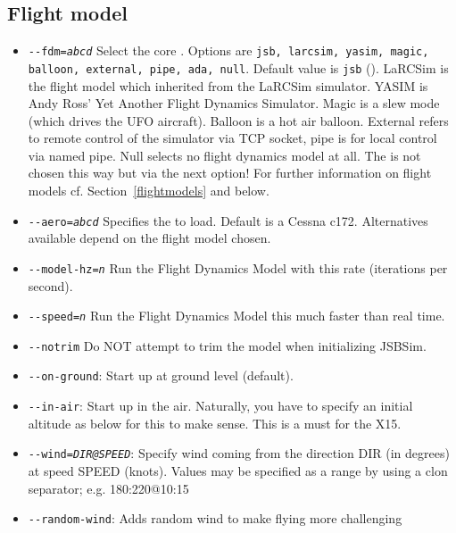 \subsection{Flight model}\label{flight dynamics model}
\begin{itemize}
\item{\texttt{-$ $-fdm={\it abcd}}} Select the core .
Options are \texttt{jsb, larcsim, yasim, magic, balloon, external, pipe, ada, null}. Default value is
\texttt{jsb} (\JSBSim). LaRCSim is the flight model which
\FlightGear{} inherited from the LaRCSim simulator.  YASIM is Andy Ross' Yet
Another Flight Dynamics Simulator. Magic is a slew mode (which drives the
UFO aircraft). Balloon is a hot air balloon. External refers to remote
control of the simulator via TCP socket, pipe is for local control via named
pipe. Null selects no flight dynamics model at all. The  is not chosen this way but via the next option! For further
information on flight models cf. Section~\ref{flightmodels} and below.
\item{\texttt{-$ $-aero={\it abcd}}} Specifies the  to load. Default is a Cessna c172. Alternatives available depend on the flight model chosen.
\item{\texttt{-$ $-model-hz={\it n}}} Run the Flight Dynamics Model with this rate
(iterations per second).
\item{\texttt{-$ $-speed={\it n}}} Run the Flight Dynamics Model this much faster than real
time.
\item{\texttt{-$ $-notrim}} Do NOT attempt to trim the model when initializing JSBSim.
\item{\texttt{-$ $-on-ground}}: Start up at ground level (default).
\item{\texttt{-$ $-in-air}}: Start up in the air. Naturally, you have to specify an
initial altitude as below for this to make sense. This is a must for the X15.
\item{\texttt{-$ $-wind={\it DIR@SPEED}}}: Specify wind coming from the direction DIR (in
degrees) at speed SPEED (knots). Values may be specified as a range by using a clon separator; e.g. 180:220@10:15
\item{\texttt{-$ $-random-wind}}: Adds random wind to make flying more challenging
\end{itemize}

